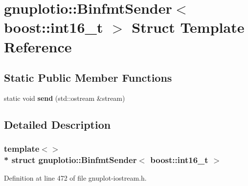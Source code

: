 \hypertarget{structgnuplotio_1_1_binfmt_sender_3_01boost_1_1int16__t_01_4}{}\section{gnuplotio\+:\+:Binfmt\+Sender$<$ boost\+:\+:int16\+\_\+t $>$ Struct Template Reference}
\label{structgnuplotio_1_1_binfmt_sender_3_01boost_1_1int16__t_01_4}
\subsection*{Static Public Member Functions}
\begin{DoxyCompactItemize}
\item 
static void {\bfseries send} (std\+::ostream \&stream)\hypertarget{structgnuplotio_1_1_binfmt_sender_3_01boost_1_1int16__t_01_4_a6d3c1b829c9196fa9d1f53bd78a90e34}{}\label{structgnuplotio_1_1_binfmt_sender_3_01boost_1_1int16__t_01_4_a6d3c1b829c9196fa9d1f53bd78a90e34}

\end{DoxyCompactItemize}


\subsection{Detailed Description}
\subsubsection*{template$<$$>$\\*
struct gnuplotio\+::\+Binfmt\+Sender$<$ boost\+::int16\+\_\+t $>$}



Definition at line 472 of file gnuplot-\/iostream.\+h.

